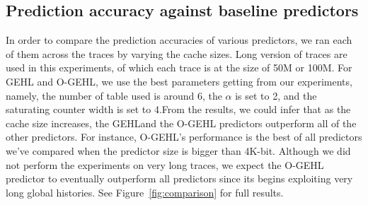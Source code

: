 \subsection{Prediction accuracy against baseline predictors}
In order to compare the prediction accuracies of various predictors, we ran
each of them across the traces by varying the cache sizes. Long version of
traces are used in this experiments, of which each trace is at the size of 50M
or 100M. For GEHL and O-GEHL, we use the best parameters getting from our
experiments, namely, the number of table used is around 6, the $\alpha$ is set
to 2, and the saturating counter width is set to 4.From the results, we could
infer that as the cache size increases, the GEHLand the O-GEHL predictors
outperform all of the other predictors. For instance, O-GEHL's performance is
the best of all predictors we've compared when the predictor size is bigger
than 4K-bit. Although we did not perform the experiments on very long traces,
we expect the O-GEHL predictor to eventually outperform all predictors since
its begins exploiting very long global histories.  See
Figure~\ref{fig:comparison} for full results.
